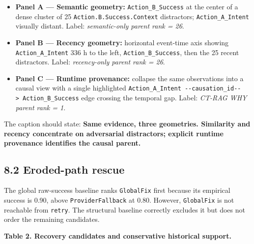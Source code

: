 \documentclass[
  11pt,
]{article}
\providecommand{\tightlist}{%
  \setlength{\itemsep}{0pt}\setlength{\parskip}{0pt}}
\begin{document}
\begin{itemize}
\tightlist
\item
  \textbf{Panel A --- Semantic geometry:} \texttt{Action\_B\_Success} at
  the center of a dense cluster of 25 \texttt{Action.B.Success.Context}
  distractors; \texttt{Action\_A\_Intent} visually distant. Label:
  \emph{semantic-only parent rank = 26}.
\item
  \textbf{Panel B --- Recency geometry:} horizontal event-time axis
  showing \texttt{Action\_A\_Intent} 336 h to the left,
  \texttt{Action\_B\_Success}, then the 25 recent distractors. Label:
  \emph{recency-only parent rank = 26}.
\item
  \textbf{Panel C --- Runtime provenance:} collapse the same
  observations into a causal view with a single highlighted
  \texttt{Action\_A\_Intent\ -\/-causation\_id-\/-\textgreater{}\ Action\_B\_Success}
  edge crossing the temporal gap. Label: \emph{CT-RAG WHY parent rank =
  1}.
\end{itemize}

The caption should state: \textbf{Same evidence, three geometries.
Similarity and recency concentrate on adversarial distractors; explicit
runtime provenance identifies the causal parent.}

\subsection{8.2 Eroded-path rescue}\label{eroded-path-rescue}

The global raw-success baseline ranks \texttt{GlobalFix} first because
its empirical success is 0.90, above \texttt{ProviderFallback} at 0.80.
However, \texttt{GlobalFix} is not reachable from \texttt{retry}. The
structural baseline correctly excludes it but does not order the
remaining candidates.

\textbf{Table 2. Recovery candidates and conservative historical
support.}
\end{document}
